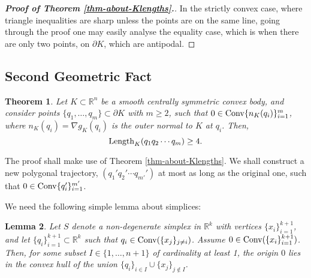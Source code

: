 \documentclass[11pt]{article}
\def\RR{\mathbb{R}}
\newtheorem{lemma}{Lemma}[section]
\newtheorem{remark}[lemma]{Remark}
\newtheorem{theorem}[lemma]{Theorem}
\begin{document}
{\begin{proof}[{\bf Proof of Theorem \ref{thm-about-Klengths}.}]
 In the strictly convex case, where triangle inequalities are sharp unless the points are on the same line, 
going through the proof one may easily analyse the equality case, which is when there are only two points, on $\partial K$, which are antipodal.

\end{proof}



\subsection{Second Geometric Fact}\label{sec:noneedfor0}


\begin{theorem}\label{thm-about-Klengths-withoutconv}
Let $K\subset \RR^n$ be a smooth centrally symmetric convex body, and consider points
$\{q_1, \ldots, q_{m}\}\subset \partial K$ with $m\ge 2$, such that $0 \in \mathop{\rm Conv}\{n_K(q_i)\}_{i=1}^{m}$, where $n_K(q_i) = \nabla g_K(q_i)$ is the outer normal to $K$ at $q_i$.
Then, 
$$
{\rm Length}_K(q_1 q_2 \cdots q_{m}) \geq 4.
$$
\end{theorem}

The proof shall make use of Theorem \ref{thm-about-Klengths}. We shall construct a new polygonal trajectory, $(q_1' q_2' \cdots q_{m'}')$ at most as long as the original one, such that $0\in   {\rm Conv}\{q_i'\}_{i=1}^{m'}$.

We need the following simple lemma about simplices:
 
\begin{lemma} \label{lemma-about-simplices}
\label{lemma-simplexcover}
Let $S$ denote a non-degenerate simplex in ${\mathbb R}^k$ with vertices $\{x_i\}_{i=1}^{k+1}$, and let $\{q_i\}_{i=1}^{k+1}\subset {\mathbb R}^k$ such that $q_i \in {\rm Conv}(\{x_j\}_{j\neq i})$.  Assume $0\in {\rm Conv}(\{x_i\}_{i=1}^{k+1})$. Then, for some  subset $I\in \{1,\ldots,n+1\}$ of cardinality at least 1, the origin $0$ lies in the convex hull of the union $\{q_i\}_{i\in I}\cup \{x_j\}_{j\not\in I}$. 
\end{lemma}

}
\end{document}

